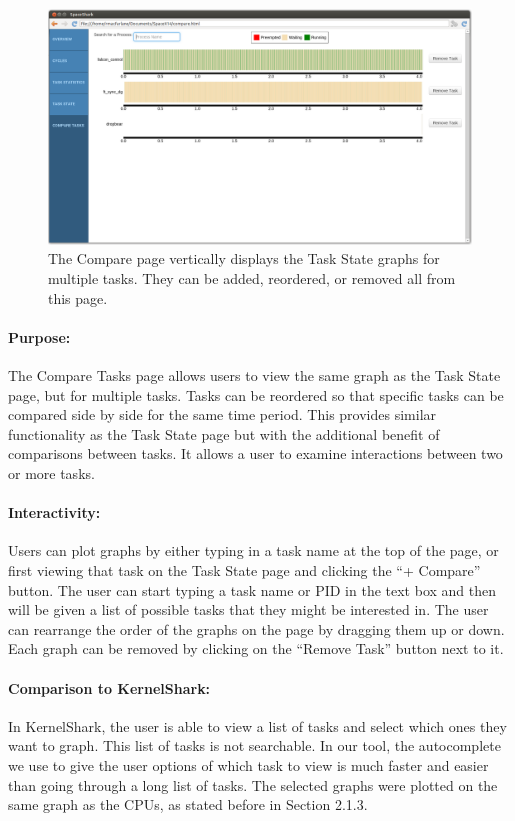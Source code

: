 \documentclass{hmcclinic}
\begin{document}
  \begin{figure}[H]
  \includegraphics[scale=0.25]{compare-page.png}
  \caption{The Compare page vertically displays the Task State graphs for
  multiple tasks. They can be added, reordered, or removed all from this page.}
  \end{figure}

\paragraph{Purpose:}
The Compare Tasks page allows users to view the same graph as the Task State
page, but for multiple tasks. Tasks can be reordered so that specific tasks can
be compared side by side for the same time period. This provides similar
functionality as the Task State page but with the additional benefit of
comparisons between tasks. It allows a user to examine interactions between
two or more tasks. 

\paragraph{Interactivity:}
Users can plot graphs by either typing in a task name at the top of the page, or first viewing that task on the Task State page and clicking the ``+ Compare'' button. The user can start typing a task name or PID in the text box and then will be given a list of possible tasks that they might be interested in. The user can rearrange the order of the graphs on the page by dragging them up or down. Each graph can be removed by clicking on the ``Remove Task'' button next to it.
    
\paragraph{Comparison to KernelShark:}
    In KernelShark, the user is able to view a list of tasks and select which ones they want to graph.  This list of tasks is not searchable. In our tool, the autocomplete we use to give the user options of which task to view is much faster and easier than going through a long list of tasks. The selected graphs were plotted on the same graph as the CPUs, as stated before in Section 2.1.3. 
\end{document}
